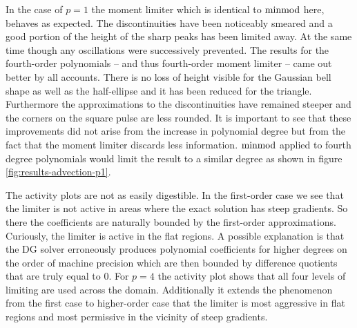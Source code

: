 In the case of $p = 1$ the moment limiter which is identical to $\operatorname{minmod}$ here, behaves as expected.
The discontinuities have been noticeably smeared and a good portion of the height of the sharp peaks has been limited away.
At the same time though any oscillations were successively prevented.
The results for the fourth-order polynomials -- and thus fourth-order moment limiter -- came out better by all accounts.
There is no loss of height visible for the Gaussian bell shape as well as the half-ellipse and it has been reduced for the triangle.
Furthermore the approximations to the discontinuities have remained steeper and the corners on the square pulse are less rounded.
It is important to see that these improvements did not arise from the increase in polynomial degree but from the fact that the moment limiter discards less information.
$\operatorname{minmod}$ applied to fourth degree polynomials would limit the result to a similar degree as shown in figure \ref{fig:results-advection-p1}.

The activity plots are not as easily digestible.
In the first-order case we see that the limiter is not active in areas where the exact solution has steep gradients.
So there the coefficients are naturally bounded by the first-order approximations.
Curiously, the limiter is active in the flat regions.
A possible explanation is that the DG solver erroneously produces polynomial coefficients for higher degrees on the order of machine precision which are then bounded by difference quotients that are truly equal to $0$.
For $p = 4$ the activity plot shows that all four levels of limiting are used across the domain.
Additionally it extends the phenomenon from the first case to higher-order case that the limiter is most aggressive in flat regions and most permissive in the vicinity of steep gradients.
